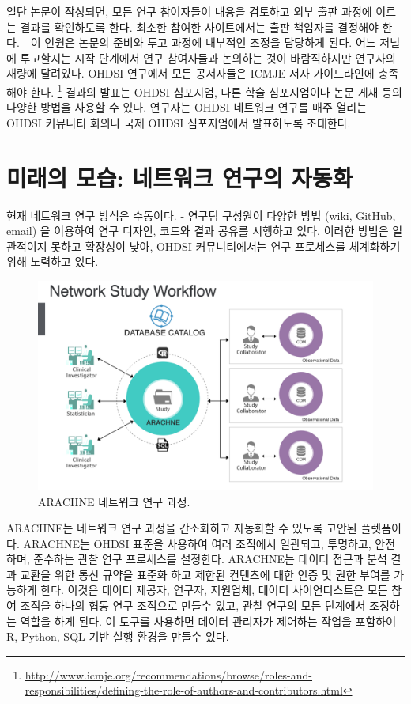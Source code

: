 \documentclass[11pt]{book}
\let\rmarkdownfootnote\footnote%
\def\footnote{\protect\rmarkdownfootnote}
\theoremstyle{definition}
\theoremstyle{definition}
\theoremstyle{definition}
\theoremstyle{remark}
\begin{document}
일단 논문이 작성되면, 모든 연구 참여자들이 내용을 검토하고 외부 출판
과정에 이르는 결과를 확인하도록 한다. 최소한 참여한 사이트에서는 출판
책임자를 결정해야 한다. - 이 인원은 논문의 준비와 투고 과정에 내부적인
조정을 담당하게 된다. 어느 저널에 투고할지는 시작 단계에서 연구
참여자들과 논의하는 것이 바람직하지만 연구자의 재량에 달려있다. OHDSI
연구에서 모든 공저자들은 ICMJE 저자 가이드라인에 충족해야 한다.
\footnote{\url{http://www.icmje.org/recommendations/browse/roles-and-responsibilities/defining-the-role-of-authors-and-contributors.html}}
결과의 발표는 OHDSI 심포지엄, 다른 학술 심포지엄이나 논문 게재 등의
다양한 방법을 사용할 수 있다. 연구자는 OHDSI 네트워크 연구를 매주 열리는
OHDSI 커뮤니티 회의나 국제 OHDSI 심포지엄에서 발표하도록 초대한다.

\section{미래의 모습: 네트워크 연구의 자동화}\label{----}


현재 네트워크 연구 방식은 수동이다. - 연구팀 구성원이 다양한 방법 (wiki,
GitHub, email) 을 이용하여 연구 디자인, 코드와 결과 공유를 시행하고
있다. 이러한 방법은 일관적이지 못하고 확장성이 낮아, OHDSI
커뮤니티에서는 연구 프로세스를 체계화하기 위해 노력하고 있다.

\begin{figure}[h]

{\centering \includegraphics[width=0.9\linewidth]{images/NetworkStudies/ARACHNE} 

}

\caption{ARACHNE 네트워크 연구 과정.}\label{fig:arachne}
\end{figure}

ARACHNE는 네트워크 연구 과정을 간소화하고 자동화할 수 있도록 고안된
플렛폼이다. ARACHNE는 OHDSI 표준을 사용하여 여러 조직에서 일관되고,
투명하고, 안전하며, 준수하는 관찰 연구 프로세스를 설정한다. ARACHNE는
데이터 접근과 분석 결과 교환을 위한 통신 규약을 표준화 하고 제한된
컨텐츠에 대한 인증 및 권한 부여를 가능하게 한다. 이것은 데이터 제공자,
연구자, 지원업체, 데이터 사이언티스트은 모든 참여 조직을 하나의 협동
연구 조직으로 만들수 있고, 관찰 연구의 모든 단계에서 조정하는 역할을
하게 된다. 이 도구를 사용하면 데이터 관리자가 제어하는 작업을 포함하여
R, Python, SQL 기반 실행 환경을 만들수 있다.
\end{document}
